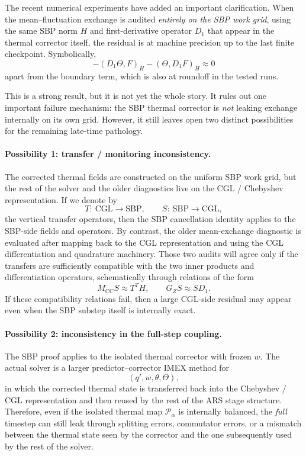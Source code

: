 \documentclass[11pt]{article}
\begin{document}
The recent numerical experiments have added an important clarification. When
the mean--fluctuation exchange is audited \emph{entirely on the SBP work grid},
using the same SBP norm $H$ and first-derivative operator $D_1$ that appear in
the thermal corrector itself, the residual is at machine precision up to the
last finite checkpoint. Symbolically,
\[
-(D_1\Theta,F)_H - (\Theta,D_1F)_H \approx 0
\]
apart from the boundary term, which is also at roundoff in the tested runs.

This is a strong result, but it is not yet the whole story. It rules out one
important failure mechanism: the SBP thermal corrector is \emph{not} leaking
exchange internally on its own grid. However, it still leaves open two
distinct possibilities for the remaining late-time pathology.

\paragraph{Possibility 1: transfer / monitoring inconsistency.}
The corrected thermal fields are constructed on the uniform SBP work grid, but
the rest of the solver and the older diagnostics live on the CGL / Chebyshev
representation. If we denote by
\[
T:\ \text{CGL} \to \text{SBP},
\qquad
S:\ \text{SBP} \to \text{CGL},
\]
the vertical transfer operators, then the SBP cancellation identity applies to
the SBP-side fields and operators. By contrast, the older mean-exchange
diagnostic is evaluated after mapping back to the CGL representation and using
the CGL differentiation and quadrature machinery. Those two audits will agree
only if the transfers are sufficiently compatible with the two inner products
and differentiation operators, schematically through relations of the form
\[
M_{\mathrm{CC}} S \approx T^T H,
\qquad
G_Z S \approx S D_1.
\]
If these compatibility relations fail, then a large CGL-side residual may
appear even when the SBP substep itself is internally exact.

\paragraph{Possibility 2: inconsistency in the full-step coupling.}
The SBP proof applies to the isolated thermal corrector with frozen $w$. The
actual solver is a larger predictor--corrector IMEX method for
\[
(q',w,\theta,\Theta),
\]
in which the corrected thermal state is transferred back into the Chebyshev /
CGL representation and then reused by the rest of the ARS stage structure.
Therefore, even if the isolated thermal map $\mathcal P_\alpha$ is internally
balanced, the \emph{full} timestep can still leak through splitting errors,
commutator errors, or a mismatch between the thermal state seen by the
corrector and the one subsequently used by the rest of the solver.
\end{document}
